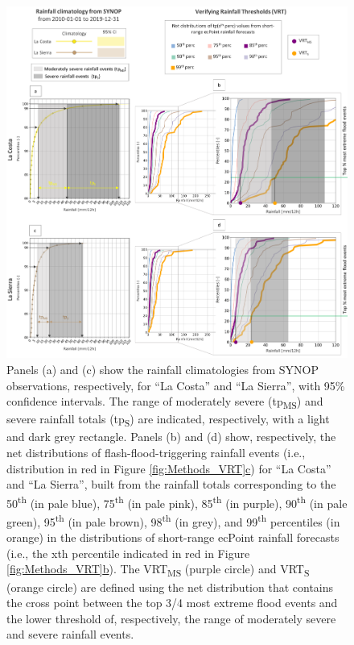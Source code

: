 \documentclass[techmemo]{ecmwfrep}%
\begin{document}
\begin{figure}
\centering
\includegraphics[width=\textwidth]{Figures/09_RESULTS_VRTs.png}
\caption{Panels (a) and (c) show the rainfall climatologies from SYNOP observations, respectively, for “La Costa” and “La Sierra”, with 95\% confidence intervals. The range of moderately severe (tp\textsubscript{MS}) and severe rainfall totals (tp\textsubscript{S}) are indicated, respectively, with a light and dark grey rectangle. Panels (b) and (d) show, respectively, the net distributions of flash-flood-triggering rainfall events (i.e., distribution in red in Figure \ref{fig:Methods_VRT}\hyperref[fig:Methods_VRT]{c}) for “La Costa” and “La Sierra”, built from the rainfall totals corresponding to the 50\textsuperscript{th} (in pale blue), 75\textsuperscript{th} (in pale pink), 85\textsuperscript{th} (in purple), 90\textsuperscript{th} (in pale green), 95\textsuperscript{th} (in pale brown), 98\textsuperscript{th} (in grey), and 99\textsuperscript{th} percentiles (in orange) in the distributions of short-range ecPoint rainfall forecasts (i.e., the xth percentile indicated in red in Figure \ref{fig:Methods_VRT}\hyperref[fig:Methods_VRT]{b}). The VRT\textsubscript{MS} (purple circle) and VRT\textsubscript{S} (orange circle) are defined using the net distribution that contains the cross point between the top 3/4 most extreme flood events and the lower threshold of, respectively, the range of moderately severe and severe rainfall events.}
\label{fig:Results_VRT}
\end{figure}
\end{document}
